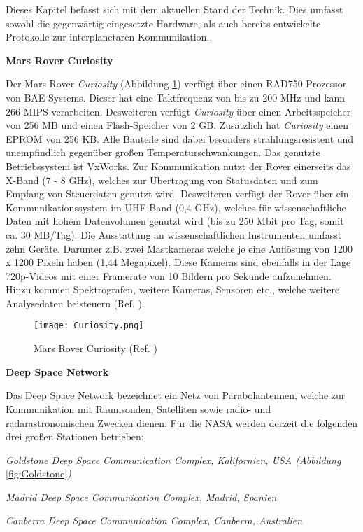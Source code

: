 \label{cap:standDerTechnik}
Dieses Kapitel befasst sich mit dem aktuellen Stand der Technik. Dies
umfasst sowohl die gegenw{\"a}rtig eingesetzte Hardware, als auch bereits
entwickelte Protokolle zur interplanetaren Kommunikation.


\textbf{Mars Rover Curiosity} 

Der Mars Rover \textit{Curiosity} (Abbildung \ref{fig:Curiosity}) verf{\"u}gt
{\"u}ber einen RAD750 Prozessor von BAE-Systems.
Dieser hat eine Taktfrequenz von bis zu 200 MHz und kann 266 MIPS
verarbeiten. Desweiteren verf{\"u}gt \textit{Curiosity} {\"u}ber einen
Arbeitsspeicher von 256 MB und einen Flash-Speicher von 2 GB. Zus{\"a}tzlich hat
\textit{Curiosity} einen EPROM von 256 KB. Alle Bauteile sind dabei besonders
strahlungsresistent und unempfindlich gegen{\"u}ber gro{\ss}en
Temperaturschwankungen. Das genutzte Betriebssystem ist VxWorks.
Zur Kommunikation nutzt der Rover einerseits das X-Band (7 - 8 GHz), welches zur
{\"U}bertragung von Statusdaten und zum Empfang von Steuerdaten genutzt wird.
Desweiteren verf{\"u}gt der Rover {\"u}ber ein Kommunikationssystem im UHF-Band
(0,4 GHz), welches f{\"u}r wissenschaftliche Daten mit hohem Datenvolumen
genutzt wird (bis zu 250 Mbit pro Tag, somit ca. 30 MB/Tag). Die Ausstattung an
wissenschaftlichen Instrumenten umfasst zehn Ger{\"a}te. Darunter z.B. zwei
Mastkameras welche je eine Aufl{\"o}sung von 1200 x 1200 Pixeln haben (1,44
Megapixel). Diese Kameras sind ebenfalls in der Lage 720p-Videos mit einer
Framerate von 10 Bildern pro Sekunde aufzunehmen. Hinzu kommen Spektrografen,
weitere Kameras, Sensoren etc., welche weitere Analysedaten beisteuern (Ref.
\cite{web5}).

\begin{figure}[H]
\centering
\texttt{[image: Curiosity.png]}
\caption{Mars Rover Curiosity (Ref. \cite{imgCuriosity})}
\label{fig:Curiosity}
\end{figure}

\textbf{Deep Space Network}

Das Deep Space Network bezeichnet ein Netz von Parabolantennen, welche zur
Kommunikation mit Raumsonden, Satelliten sowie radio-
und radarastronomischen Zwecken dienen. F{\"u}r die NASA werden derzeit die
folgenden drei gro{\ss}en Stationen betrieben:

\begin{compactenum}[a)]
\item \textit{Goldstone Deep Space Communication Complex, Kalifornien, USA
(Abbildung} \ref{fig:Goldstone}\textit{)}
\item \textit{Madrid Deep Space Communication Complex, Madrid, Spanien}
\item \textit{Canberra Deep Space Communication Complex, Canberra, Australien}
\end{compactenum}

